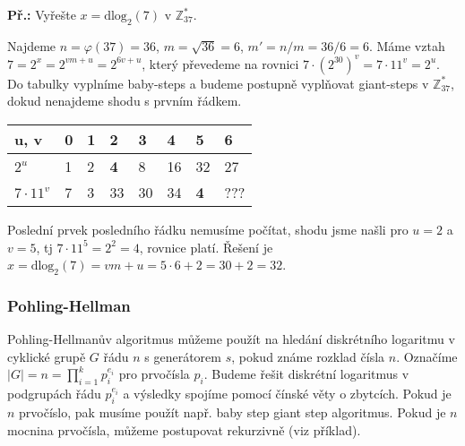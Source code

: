 \documentclass[10pt,a4paper]{article}
\begin{document}
\begin{exercise}
\textbf{Př.:} Vyřešte $x = \text{dlog}_2 (7)$ v $\mathbb{Z}_{37}^*$.

Najdeme $n = \varphi(37) = 36$, $m = \sqrt{36} = 6$, $m' = n/m = 36/6 = 6$. Máme
vztah $7 = 2^x = 2^{vm + u} = 2^{6v + u}$, který převedeme na rovnici $7\cdot
(2^{30})^v =7\cdot 11^v = 2^u$. Do tabulky vyplníme baby-steps a budeme postupně
vyplňovat giant-steps v $\mathbb{Z}_{37}^*$, dokud nenajdeme shodu s prvním
řádkem.

\begin{center}
\centering
\begin{tabular}{|p{1cm}|p{1cm}|p{1cm}|p{1cm}|p{1cm}|p{1cm}|p{1cm}|p{1cm}|}
\hline
u, v & 0 & 1 & 2 &3 & 4 & 5 & 6\\
\hline
\hline
$2^u$ & 1 & 2 & \textbf{4} & 8 & 16 & 32 & 27\\
\hline
$7\cdot 11^v$ & 7 & 3 & 33 & 30 & 34 & \textbf{4} & ??? \\
\hline
\end{tabular}
\end{center}

Poslední prvek posledního řádku nemusíme počítat, shodu jsme našli pro $u=2$ a
$v=5$, tj $7\cdot 11^5 = 2^2 = 4$, rovnice platí. Řešení je $x = \text{dlog}_2
(7) = vm + u = 5\cdot6 + 2 = 30 + 2 = 32$.
\end{exercise}

\subsubsection{Pohling-Hellman}
Pohling-Hellmanův algoritmus můžeme použít na hledání diskrétního logaritmu v
cyklické grupě $G$ řádu $n$ s generátorem $s$, pokud známe rozklad čísla $n$.
Označíme $|G| = n = \prod_{i=1}^k p_i^{e_i}$ pro prvočísla $p_i$.  Budeme řešit
diskrétní logaritmus v podgrupách řádu $p_i^{e_i}$ a výsledky spojíme pomocí
čínské věty o zbytcích. Pokud je $n$ prvočíslo, pak musíme použít např. baby
step giant step algoritmus. Pokud je $n$ mocnina prvočísla, můžeme postupovat
rekurzivně (viz příklad).
\end{document}
